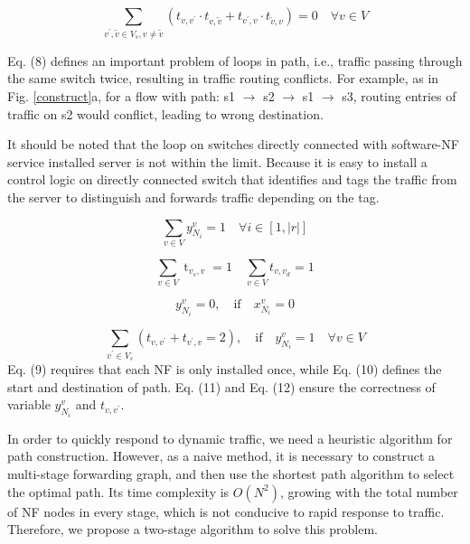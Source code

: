 \documentclass[10pt, conference, letterpaper]{IEEEtran}
\begin{document}
\begin{equation}
\sum_{v^{\prime}, \tilde{v} \in V_{s}, v \neq \tilde{v}}\left(t_{v, v^{\prime}} \cdot t_{v, \tilde{v}}+t_{v^{\prime}, v} \cdot t_{\tilde{v}, v}\right)=0 \quad \forall v \in V
\end{equation}

Eq. (8) defines an important problem of loops in path, i.e., traffic passing through the same switch twice, resulting in traffic routing conflicts. For example, as in Fig. \ref{construct}a, for a flow with path: s1 $\rightarrow$ s2 $\rightarrow$ s1 $\rightarrow$ s3, routing entries of traffic on s2 would conflict, leading to wrong destination.

It should be noted that the loop on switches directly connected with software-NF service installed server is not within the limit. Because it is easy to install a control logic on directly connected switch that identifies and tags the traffic from the server to distinguish and forwards traffic depending on the tag.

\begin{equation}
\sum_{v \in V} y_{N_{i}}^{v}=1 \quad \forall i \in \left[1, |r|\right]\end{equation}

\begin{equation}
\sum_{v \in V} \operatorname{t}_{v_{s}, v}=1 \quad \sum_{v \in V} t_{v, v_{d}}=1
\end{equation}

\begin{equation}
y_{N_{i}}^{v}=0, \quad \text{if} \quad x_{N_{i}}^{v}=0
\end{equation}

\begin{equation}
\sum_{v^{\prime} \in V_s} (t_{v, v^{\prime}} + t_{v^{\prime}, v}=2), \quad \text{if} \quad y_{N_{i}}^{v}=1 \quad \forall v \in V
\end{equation}
Eq. (9) requires that each NF is only installed once, while Eq. (10) defines the start and destination of path. Eq. (11) and Eq. (12) ensure the correctness of variable $y_{N_{i}}^{v}$ and $t_{v, v^{\prime}}$.

In order to quickly respond to dynamic traffic, we need a heuristic algorithm for path construction. However, as a naive method, it is necessary to construct a multi-stage forwarding graph, and then use the shortest path algorithm to select the optimal path. 
Its time complexity is $O(N^2)$, growing with the total number of NF nodes in every stage, which is not conducive to rapid response to traffic. Therefore, we propose a two-stage algorithm to solve this problem.
\end{document}
